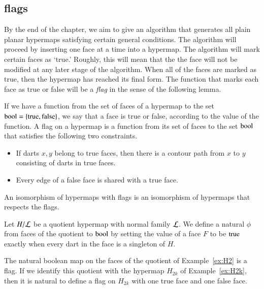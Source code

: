 \subsection{flags}

By the end of the chapter, we aim to give an algorithm that
generates all plain planar hypermaps satisfying certain general
conditions.   The algorithm will proceed by inserting one face
at a time into a hypermap.  
The algorithm will mark certain faces as `true.'
Roughly, this will mean that the the face will not be modified
at any later stage of the algorithm.   When all of the faces
are marked as true, then the hypermap has reached its final form.
The function that marks each face as true or false will be a
{\it flag} in the sense of the following lemma.



\begin{definition}  If we have a function from the set of faces of a hypermap
to the set ${\operatorname{bool}}=\{{\operatorname{true}},{\operatorname{false}}\}$, we say that a face is true or
false, according to the value of the function.  A flag on a hypermap
is a function from its set of faces to the set
${\operatorname{bool}}$ that satisfies the following two
constraints.
\begin{itemize}
    \item If darts $x,y$ belong to true faces,
    then there is a contour path from $x$ to $y$ consisting of darts
    in true faces.
    \item Every edge of a false face is shared with a true face.
    \end{itemize}
An isomorphism of hypermaps with flags is an isomorphism of
hypermaps that respects the flags.
\end{definition}

\begin{example} Let $H/{\cal L}$ be a quotient hypermap with
normal family $\cal L$.  We define
a natural $\phi$ from faces of the quotient to ${\operatorname{bool}}$ by setting
the value of a face $F$ to be ${\operatorname{true}}$ exactly when every dart in
the face is a singleton of $H$.
\end{example}

\begin{example} The natural boolean map on the faces of the
quotient of Example~\ref{ex:H2} is a flag.  If we identify this
quotient with the hypermap $H_{2k}$ of Example~\ref{ex:H2k}, 
then it is natural to define a flag
on $H_{2k}$ with one true face and one false face.
\end{example}

